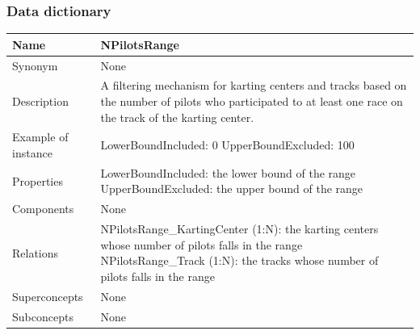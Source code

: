 \documentclass{beamer}
\begin{document}
\begin{frame}
    \frametitle{Data dictionary}
    \begin{table}
    \tiny
    \begin{tabular}{|p{2cm}|p{6cm}|}
    \hline
    Name & \textbf{NPilotsRange} \\
    \hline
    Synonym & None \\
    \hline
    Description & A filtering mechanism for karting centers and tracks based on the number of 
    pilots who participated to at least one race on the track of the karting center. \\
    \hline
    Example of instance &
    LowerBoundIncluded: 0 \newline
    UpperBoundExcluded: 100 \\
    \hline
    Properties &
    LowerBoundIncluded: the lower bound of the range \newline
    UpperBoundExcluded: the upper bound of the range \\
    \hline
    Components & None \\
    \hline
    Relations &
    NPilotsRange\_KartingCenter (1:N): the karting centers whose number of pilots falls in the range \newline
    NPilotsRange\_Track (1:N): the tracks whose number of pilots falls in the range \\
    \hline
    Superconcepts & None \\
    \hline
    Subconcepts & None \\
    \hline
    \end{tabular}
    \end{table}
\end{frame}
\end{document}
